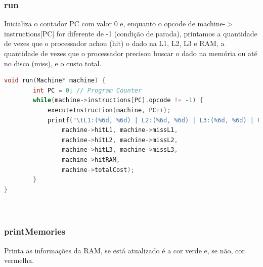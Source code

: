 \documentclass{article}
\begin{document}
\subsubsection{run}

Inicializa o contador PC com valor 0 e, enquanto o opcode de machine-$>$instructions[PC] for diferente de -1 (condição de parada), printamos a quantidade de vezes que o processador achou (hit) o dado na L1, L2, L3 e RAM, a quantidade de vezes que o processador precisou buscar o dado na memória ou até no disco (miss), e o custo total.

\begin{lstlisting}[caption={Funçao run},label={lst:cod3},language=C]
    void run(Machine* machine) {    
        int PC = 0; // Program Counter
        while(machine->instructions[PC].opcode != -1) {
            executeInstruction(machine, PC++);
            printf("\tL1:(%6d, %6d) | L2:(%6d, %6d) | L3:(%6d, %6d) | RAM:(%6d) | COST: %d\n", 
                machine->hitL1, machine->missL1, 
                machine->hitL2, machine->missL2,
                machine->hitL3, machine->missL3,
                machine->hitRAM,
                machine->totalCost);
        }
}
    
    
\end{lstlisting}

\subsubsection{printMemories}

Printa as informações da RAM, se está atualizado é a cor verde e, se não, cor vermelha.
\end{document}
